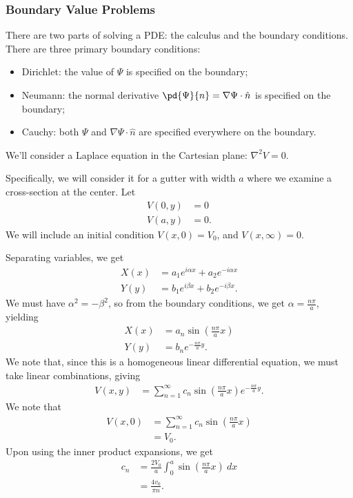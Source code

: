 \documentclass[10pt]{mypackage}
\begin{document}
  \subsubsection{Boundary Value Problems}%
  There are two parts of solving a PDE: the calculus and the boundary conditions. There are three primary boundary conditions:
  \begin{itemize}
    \item Dirichlet: the value of $\Psi$ is specified on the boundary;
    \item Neumann: the normal derivative $\pd{\Psi}{n} = \nabla\Psi\cdot \hat{n}$ is specified on the boundary;
    \item Cauchy: both $\Psi$ and $\nabla\Psi\cdot \hat{n}$ are specified everywhere on the boundary.
  \end{itemize}
  \begin{example}
    We'll consider a Laplace equation in the Cartesian plane: $\nabla^2 V = 0.$\newline

    Specifically, we will consider it for a gutter with width $a$ where we examine a cross-section at the center. Let
    \begin{align*}
      V\left( 0,y \right) &= 0\\
      V\left( a,y \right) &= 0.
    \end{align*}
    We will include an initial condition $V\left( x,0 \right) = V_0$, and $V\left( x,\infty \right) = 0$.\newline

    Separating variables, we get
    \begin{align*}
      X(x) &= a_1e^{i\alpha x} + a_2e^{-i\alpha x}\\
      Y(y) &= b_1e^{i\beta x} + b_2e^{-i\beta x}.
    \end{align*}
    We must have $\alpha^2 = -\beta^2$, so from the boundary conditions, we get $\alpha = \frac{n\pi}{a}$, yielding
    \begin{align*}
      X(x) &= a_n\sin\left( \frac{n\pi }{a}x \right)\\
      Y(y) &= b_ne^{-\frac{n\pi}{a}y}.
    \end{align*}
    We note that, since this is a homogeneous linear differential equation, we must take linear combinations, giving
    \begin{align*}
      V\left( x,y \right) &= \sum_{n=1}^{\infty}c_n\sin\left( \frac{n\pi}{a}x \right)e^{-\frac{n\pi}{a}y}.
    \end{align*}
    We note that
    \begin{align*}
      V\left( x,0 \right) &= \sum_{n=1}^{\infty}c_n\sin\left( \frac{n\pi}{a}x \right)\\
                          &= V_0.
    \end{align*}
    Upon using the inner product expansions, we get
    \begin{align*}
      c_n &= \frac{2V_0}{a} \int_{0}^{a} \sin\left( \frac{n\pi}{a}x \right)\:dx\\
          &= \frac{4v_0}{\pi n}.\tag*{for odd $n$}
    \end{align*}
  \end{example}
\end{document}
